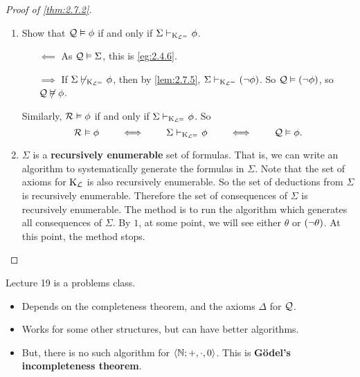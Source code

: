 \begin{proof}[Proof of \ref{thm:2.7.2}]
\hfill
\begin{enumerate}
\item Show that $ \mathcal{Q} \vDash \phi $ if and only if $ \Sigma \vdash_{\mathrm{K}_{\mathcal{L}^=}} \phi $.
\begin{itemize}
\item[$ \impliedby $] As $ \mathcal{Q} \vDash \Sigma $, this is \ref{eg:2.4.6}.
\item[$ \implies $] If $ \Sigma \not\vdash_{\mathrm{K}_{\mathcal{L}^=}} \phi $, then by \ref{lem:2.7.5}, $ \Sigma \vdash_{\K_{\LLL^=}} \notb{\phi} $. So $ \QQQ \vDash \notb{\phi} $, so $ \mathcal{Q} \not\vDash \phi $.
\end{itemize}
Similarly, $ \mathcal{R} \vDash \phi $ if and only if $ \Sigma \vdash_{\mathrm{K}_{\mathcal{L}^=}} \phi $. So
$$ \mathcal{R} \vDash \phi \qquad \iff \qquad \Sigma \vdash_{\mathrm{K}_{\mathcal{L}^=}} \phi \qquad \iff \qquad \mathcal{Q} \vDash \phi. $$
\item $ \Sigma $ is a \textbf{recursively enumerable} set of formulas. That is, we can write an algorithm to systematically generate the formulas in $ \Sigma $. Note that the set of axioms for $ \mathrm{K}_{\mathcal{L}} $ is also recursively enumerable. So the set of deductions from $ \Sigma $ is recursively enumerable. Therefore the set of consequences of $ \Sigma $ is recursively enumerable. The method is to run the algorithm which generates all consequences of $ \Sigma $. By $ 1 $, at some point, we will see either $ \theta $ or $ \notb{\theta} $. At this point, the method stops.
\end{enumerate}
\end{proof}


Lecture 19 is a problems class.


\begin{note*}
\hfill
\begin{itemize}
\item Depends on the completeness theorem, and the axioms $ \Delta $ for $ \mathcal{Q} $.
\item Works for some other structures, but can have better algorithms.
\item But, there is no such algorithm for $ \left\langle \mathbb{N}; +, \cdot, 0 \right\rangle $. This is \textbf{G\"odel's incompleteness theorem}.
\end{itemize}
\end{note*}

\pagebreak

